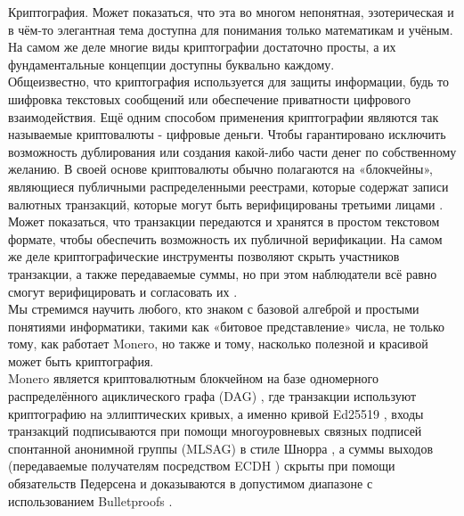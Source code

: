 

Криптография. Может показаться, что эта во многом непонятная, эзотерическая и в чём-то элегантная тема доступна для понимания только математикам и учёным. На самом же деле многие виды криптографии достаточно просты, а их фундаментальные концепции доступны буквально каждому.
\\ \newline
Общеизвестно, что криптография используется для защиты информации, будь то шифровка текстовых сообщений или обеспечение приватности цифрового взаимодействия. Ещё одним способом применения криптографии являются так называемые криптовалюты - цифровые деньги. Чтобы гарантировано исключить возможность дублирования или создания какой-либо части денег по собственному желанию. В своей основе криптовалюты обычно полагаются на «блокчейны», являющиеся публичными распределенными реестрами, которые содержат записи валютных транзакций, которые могут быть верифицированы третьими лицами \cite{Nakamoto_bitcoin}.
\\ \newline
Может показаться, что транзакции передаются и хранятся в простом текстовом формате, чтобы обеспечить возможность их публичной верификации. На самом же деле криптографические инструменты позволяют скрыть участников транзакции, а также передаваемые суммы, но при этом наблюдатели всё равно смогут верифицировать и согласовать их \cite{cryptoNoteWhitePaper}.
\\ \newline
Мы стремимся научить любого, кто знаком с базовой алгеброй и простыми понятиями информатики, такими как «битовое представление» числа, не только тому, как работает Monero, но также и тому, насколько полезной и красивой может быть криптография.
\\ \newline
Monero является криптовалютным блокчейном на базе одномерного распределённого ациклического графа (DAG) \cite{Nakamoto_bitcoin}, где транзакции используют криптографию на эллиптических кривых, а именно кривой Ed25519 \cite{Bernstein2008}, входы транзакций подписываются при помощи многоуровневых связных подписей спонтанной анонимной группы (MLSAG) в стиле Шнорра \cite{MRL-0005-ringct}, а суммы выходов (передаваемые получателям посредством ECDH \cite{Diffie-Hellman}) скрыты при помощи обязательств Педерсена \cite{maxwell-ct} и доказываются в допустимом диапазоне с использованием Bulletproofs \cite{Bulletproofs_paper}.